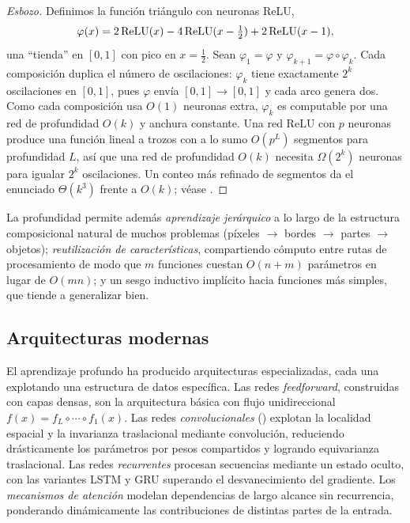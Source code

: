 \begin{proof}[Esbozo]
Definimos la funci\'on tri\'angulo con neuronas ReLU,
\[
  \varphi(x) = 2\operatorname{ReLU}(x) - 4\operatorname{ReLU}(x - \tfrac12) + 2\operatorname{ReLU}(x - 1),
\]
una ``tienda'' en $[0,1]$ con pico en $x = \tfrac12$. Sean $\varphi_1 = \varphi$ y
$\varphi_{k+1} = \varphi \circ \varphi_k$. Cada composici\'on duplica el n\'umero
de oscilaciones: $\varphi_k$ tiene exactamente $2^k$ oscilaciones en $[0,1]$, pues
$\varphi$ env\'ia $[0,1] \to [0,1]$ y cada arco genera dos. Como cada composici\'on
usa $O(1)$ neuronas extra, $\varphi_k$ es computable por una red de profundidad
$O(k)$ y anchura constante. Una red ReLU con $p$ neuronas produce una funci\'on
lineal a trozos con a lo sumo $O(p^L)$ segmentos para profundidad $L$, as\'i que
una red de profundidad $O(k)$ necesita $\Omega(2^k)$ neuronas para igualar $2^k$
oscilaciones. Un conteo m\'as refinado de segmentos da el enunciado $\Theta(k^3)$
frente a $O(k)$; v\'ease \citet{telgarsky2016benefitsdepthneuralnetworks}.
\end{proof}

La profundidad permite adem\'as \emph{aprendizaje jer\'arquico} a lo largo de la
estructura composicional natural de muchos problemas (p\'ixeles $\to$ bordes $\to$
partes $\to$ objetos); \emph{reutilizaci\'on de caracter\'isticas}, compartiendo
c\'omputo entre rutas de procesamiento de modo que $m$ funciones cuestan $O(n + m)$
par\'ametros en lugar de $O(mn)$; y un sesgo inductivo impl\'icito hacia funciones
m\'as simples, que tiende a generalizar bien.

\subsection{Arquitecturas modernas}
\label{sec:found:modern}

El aprendizaje profundo ha producido arquitecturas especializadas, cada una
explotando una estructura de datos espec\'ifica. Las redes \emph{feedforward},
construidas con capas densas, son la arquitectura b\'asica con flujo
unidireccional $f(x) = f_L \circ \cdots \circ f_1(x)$. Las redes
\emph{convolucionales} () explotan la localidad espacial y la
invarianza traslacional mediante convoluci\'on, reduciendo dr\'asticamente los
par\'ametros por pesos compartidos y logrando equivarianza traslacional. Las redes
\emph{recurrentes} procesan secuencias mediante un estado oculto, con las variantes
LSTM y GRU superando el desvanecimiento del gradiente. Los \emph{mecanismos de
atenci\'on} modelan dependencias de largo alcance sin recurrencia, ponderando
din\'amicamente las contribuciones de distintas partes de la entrada.

